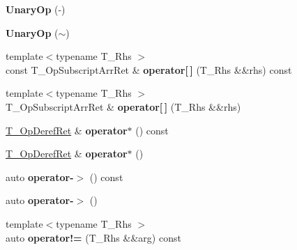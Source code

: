 \begin{DoxyCompactItemize}
{\bfseries Unary\+Op} (-\/)
\item 
\mbox{\label{classrlbox_1_1tainted__base__impl_ac450c85ec8fa3c5046bcf3fb7aeca2d1}} 
{\bfseries Unary\+Op} ($\sim$)
\item 
\mbox{\label{classrlbox_1_1tainted__base__impl_ad71e3e71f23ee730d9c6a9f9fc4d557e}} 
{\footnotesize template$<$typename T\+\_\+\+Rhs $>$ }\\const T\+\_\+\+Op\+Subscript\+Arr\+Ret \& {\bfseries operator\mbox{[}$\,$\mbox{]}} (T\+\_\+\+Rhs \&\&rhs) const
\item 
\mbox{\label{classrlbox_1_1tainted__base__impl_a6fd9a75009eee8738dd0a7625bb2b1fc}} 
{\footnotesize template$<$typename T\+\_\+\+Rhs $>$ }\\T\+\_\+\+Op\+Subscript\+Arr\+Ret \& {\bfseries operator\mbox{[}$\,$\mbox{]}} (T\+\_\+\+Rhs \&\&rhs)
\item 
\mbox{\label{classrlbox_1_1tainted__base__impl_ae308e3faece4fe51254f38814220bcef}} 
\hyperlink{classrlbox_1_1tainted__volatile}{T\+\_\+\+Op\+Deref\+Ret} \& {\bfseries operator$\ast$} () const
\item 
\mbox{\label{classrlbox_1_1tainted__base__impl_a8fd7566680b44852f260d8431ee4d196}} 
\hyperlink{classrlbox_1_1tainted__volatile}{T\+\_\+\+Op\+Deref\+Ret} \& {\bfseries operator$\ast$} ()
\item 
\mbox{\label{classrlbox_1_1tainted__base__impl_a3e8fdb261d771cb7b5c9af33fe52ff35}} 
auto {\bfseries operator-\/$>$} () const
\item 
\mbox{\label{classrlbox_1_1tainted__base__impl_a52c2403f1851a0e2d295a712d8d10029}} 
auto {\bfseries operator-\/$>$} ()
\item 
\mbox{\label{classrlbox_1_1tainted__base__impl_ad22f860fd026994b29fbfe619d1cce36}} 
{\footnotesize template$<$typename T\+\_\+\+Rhs $>$ }\\auto {\bfseries operator!=} (T\+\_\+\+Rhs \&\&arg) const
\item 

\end{DoxyCompactItemize}
